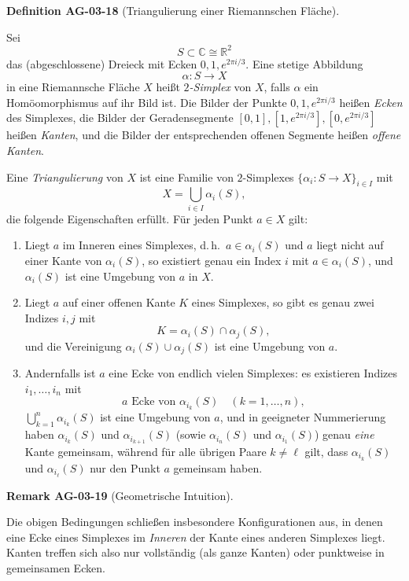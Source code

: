 \documentclass[10pt, letterpaper]{article}
\newcommand{\R}{\mathbb{R}}
\newcommand{\C}{\mathbb{C}}
\newcommand{\CustomHeading}[3]{%
  \par\medskip\noindent%
  \textbf{#1 #2} \textnormal{(#3)}.\enskip%
}
\newenvironment{DEF}[2]{\begin{unitbox}\CustomHeading{Definition}{#1}{#2}}{\end{unitbox}}
\newenvironment{REM}[2]{\begin{unitbox}\CustomHeading{Remark}{#1}{#2}}{\end{unitbox}}
\begin{document}
\begin{DEF}{AG-03-18}{Triangulierung einer Riemannschen Fläche}
Sei 
\[
S \subset \C \cong \R^2
\]
das (abgeschlossene) Dreieck mit Ecken \(0,1,e^{2\pi i/3}\).
Eine stetige Abbildung
\[
\alpha:S\to X
\]
in eine Riemannsche Fläche \(X\) heißt \emph{\(2\)-Simplex} von \(X\), falls
\(\alpha\) ein Homöomorphismus auf ihr Bild ist. Die Bilder der Punkte
\(0,1,e^{2\pi i/3}\) heißen \emph{Ecken} des Simplexes, die Bilder der
Geradensegmente \([0,1], [1,e^{2\pi i/3}], [0,e^{2\pi i/3}]\) heißen
\emph{Kanten}, und die Bilder der entsprechenden offenen Segmente heißen
\emph{offene Kanten}.

Eine \emph{Triangulierung} von \(X\) ist eine Familie von \(2\)-Simplexes
\(\{\alpha_i:S\to X\}_{i\in I}\) mit
\[
X = \bigcup_{i\in I} \alpha_i(S),
\]
die folgende Eigenschaften erfüllt. Für jeden Punkt \(a\in X\) gilt:

\begin{enumerate}[label=\roman*)]
\item Liegt \(a\) im Inneren eines Simplexes, d.\,h.\ 
\(a\in \alpha_i(S)\) und \(a\) liegt nicht auf einer Kante von \(\alpha_i(S)\),
so existiert genau ein Index \(i\) mit \(a\in \alpha_i(S)\), und
\(\alpha_i(S)\) ist eine Umgebung von \(a\) in \(X\).

\item Liegt \(a\) auf einer offenen Kante \(K\) eines Simplexes,
so gibt es genau zwei Indizes \(i,j\) mit
\[
K = \alpha_i(S)\cap \alpha_j(S),
\]
und die Vereinigung \(\alpha_i(S)\cup \alpha_j(S)\) ist eine Umgebung von \(a\).

\item Andernfalls ist \(a\) eine Ecke von endlich vielen Simplexes:
es existieren Indizes \(i_1,\dots,i_n\) mit
\[
a \text{ Ecke von } \alpha_{i_k}(S) \quad (k=1,\dots,n),
\]
\(\bigcup_{k=1}^n \alpha_{i_k}(S)\) ist eine Umgebung von \(a\),
und in geeigneter Nummerierung haben
\(\alpha_{i_k}(S)\) und \(\alpha_{i_{k+1}}(S)\) (sowie
\(\alpha_{i_n}(S)\) und \(\alpha_{i_1}(S)\)) genau \emph{eine} Kante
gemeinsam, während für alle übrigen Paare \(k\neq \ell\) gilt, dass
\(\alpha_{i_k}(S)\) und \(\alpha_{i_\ell}(S)\) nur den Punkt \(a\) gemeinsam haben.
\end{enumerate}
\end{DEF}

\begin{REM}{AG-03-19}{Geometrische Intuition}
Die obigen Bedingungen schließen insbesondere Konfigurationen aus, in denen
eine Ecke eines Simplexes im \emph{Inneren} der Kante eines anderen Simplexes
liegt. Kanten treffen sich also nur vollständig (als ganze Kanten) oder
punktweise in gemeinsamen Ecken.
\end{REM}
\end{document}
